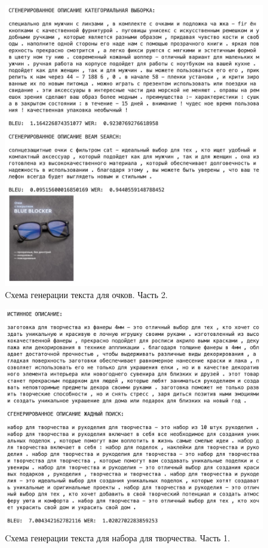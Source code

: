 \documentclass[a4paper,12pt]{extarticle}
\begin{document}
\newpage
\begin{figure}[ht]
	\centering
	\includegraphics[scale=0.4]{test-rnn-glass-2.png}
	\caption{Cхема генерации текста для очков. Часть 2.}
	\label{fig:test-rnn-glass-2}
\end{figure}

\newpage
\begin{figure}[ht]
	\centering
	\includegraphics[scale=0.3]{test-rnn-art-1.png}
	\caption{Cхема генерации текста для набора для творчества. Часть 1.}
	\label{fig:test-rnn-art-1}
\end{figure}
\end{document}
